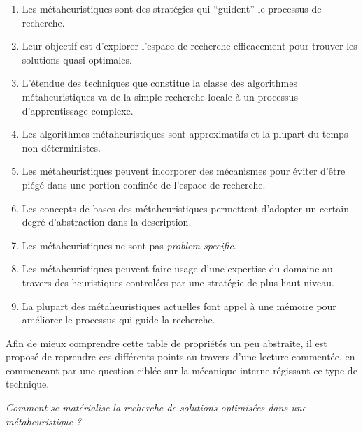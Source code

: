 \begin{enumerate}[label=(\alph*),labelindent=\parindent,leftmargin=*]
	\item Les métaheuristiques sont des stratégies qui \enquote{guident} le processus de recherche. \label{enum_meta_a}
	\item Leur objectif est d'explorer l'espace de recherche efficacement pour trouver les solutions quasi-optimales. \label{enum_meta_b}
	\item L'étendue des techniques que constitue la classe des algorithmes métaheuristiques va de la simple recherche locale à un processus d'apprentissage complexe. \label{enum_meta_c}
	\item Les algorithmes métaheuristiques sont approximatifs et la plupart du temps non déterministes. \label{enum_meta_d}
	\item Les métaheuristiques peuvent incorporer des mécanismes pour éviter d'être piégé dans une portion confinée de l'espace de recherche. \label{enum_meta_e}
	\item Les concepts de bases des métaheuristiques permettent d'adopter un certain degré d'abstraction dans la description. \label{enum_meta_f}
	\item Les métaheuristiques ne sont pas \textit{problem-specific}. \label{enum_meta_g}
	\item Les métaheuristiques peuvent faire usage d'une expertise du domaine au travers des heuristiques controlées par une stratégie de plus haut niveau. \label{enum_meta_h}
	\item La plupart des métaheuristiques actuelles font appel à une mémoire pour améliorer le processus qui guide la recherche. \label{enum_meta_i}
\end{enumerate}

Afin de mieux comprendre cette table de propriétés un peu abstraite, il est proposé de reprendre ces différents points au travers d'une lecture commentée, en commencant par une question ciblée sur la mécanique interne régissant ce type de technique.

\textit{Comment se matérialise la recherche de solutions optimisées dans une métaheuristique ?}

